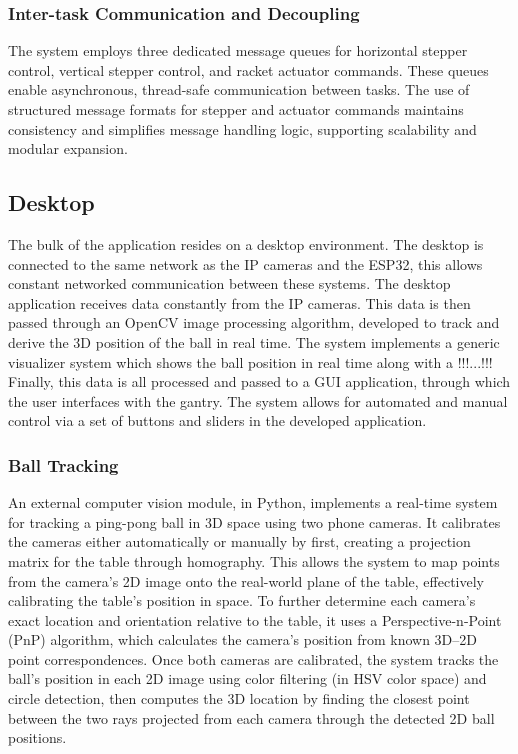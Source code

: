 \subsubsection{Inter-task Communication and Decoupling}
The system employs three dedicated message queues for horizontal stepper control, vertical stepper control, and racket actuator commands. These queues enable asynchronous, thread-safe communication between tasks. The use of structured message formats for stepper and actuator commands maintains consistency and simplifies message handling logic, supporting scalability and modular expansion.

\subsection{Desktop}
The bulk of the application resides on a desktop environment. The desktop is connected to the same network as the IP cameras and the ESP32, this allows constant networked communication between these systems. The desktop application receives data constantly from the IP cameras. This data is then passed through an OpenCV image processing algorithm, developed to track and derive the 3D position of the ball in real time. The system implements a generic visualizer system which shows the ball position in real time along with a !!!...!!! Finally, this data is all processed and passed to a GUI application, through which the user interfaces with the gantry. The system allows for automated and manual control via a set of buttons and sliders in the developed application.

\subsubsection{Ball Tracking}
An external computer vision module, in Python, implements a real-time system for tracking a ping-pong ball in 3D space using two phone cameras. It calibrates the cameras either automatically or manually by first, creating a projection matrix for the table through homography. This allows the system to map points from the camera’s 2D image onto the real-world plane of the table, effectively calibrating the table’s position in space. To further determine each camera’s exact location and orientation relative to the table, it uses a Perspective-n-Point (PnP) algorithm, which calculates the camera's position from known 3D–2D point correspondences. Once both cameras are calibrated, the system tracks the ball’s position in each 2D image using color filtering (in HSV color space) and circle detection, then computes the 3D location by finding the closest point between the two rays projected from each camera through the detected 2D ball positions.


